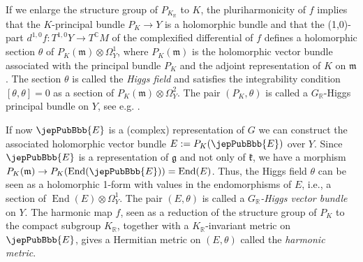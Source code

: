 If we enlarge the structure group of $P_{K_{\mathbb R}}$ to $K$, the pluriharmonicity of $f$ implies that the $K$-principal bundle $P_K\to Y$ is a holomorphic bundle and that the (1,0)-part $d^{1,0}f:T^{1,0}Y\to T^{\mathbb C}M$ of the complexified differential of $f$ defines a holomorphic section $\theta$ of $P_K(\mathfrak m)\otimes\Omega_Y^1$, where $P_K(\mathfrak m)$ is the holomorphic vector bundle associated with the principal bundle $P_K$ and the adjoint representation of $K$ on $\mathfrak m$. The section $\theta$ is called the \emph{Higgs field} and satisfies the integrability condition $[\theta,\theta]=0$ as a section of $P_K(\mathfrak m)\otimes\Omega_Y^2$. The pair $(P_K,\theta)$ is called a $G_{\mathbb R}$-Higgs principal bundle on $Y$, see e.g. \cite[\S2.2]{jep93BGPG06}.

If now $\jepPubBbb{E}$ is a (complex) representation of $G$ we can construct the associated holomorphic vector bundle $E:=P_K(\jepPubBbb{E})$ over $Y$. Since $\jepPubBbb{E}$ is a representation of $\mathfrak g$ and not only of $\mathfrak k$, we have a morphism $P_K(\mathfrak m)\to P_K(\operatorname{End}(\jepPubBbb{E}))=\operatorname{End}(E)$. Thus, the Higgs field $\theta$ can be seen as a holomorphic 1-form with values in the endomorphisms of $E$, i.e., a section of $\operatorname{End}(E)\otimes\Omega_Y^1$. The pair $(E,\theta)$ is called a \emph{$G_{\mathbb R}$-Higgs vector bundle} on $Y$. The harmonic map $f$, seen as a reduction of the structure group of $P_K$ to the compact subgroup $K_{\mathbb R}$, together with a $K_{\mathbb R}$-invariant metric on $\jepPubBbb{E}$, gives a Hermitian metric on $(E,\theta)$ called the \emph{harmonic metric}.

